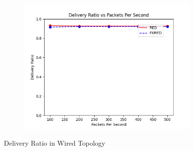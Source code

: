 \documentclass[10pt]{report}
\begin{document}
\begin{figure}
\begin{subfigure}{.5\textwidth}
        \includegraphics[width=1\linewidth]{static/graphs/wired/Delivery Ratio vs Packets Per Second.png}
    \end{subfigure}
    \caption{Delivery Ratio in Wired Topology}
    \label{fig:wired_del_ratio}
\end{figure}
\end{document}
